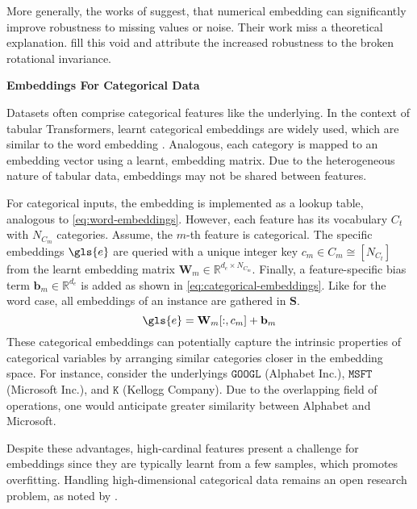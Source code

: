 More generally, the works of \textcites[][1]{gorishniyEmbeddingsNumericalFeatures2022}[][1]{somepalliSaintImprovedNeural2021} suggest, that numerical embedding can significantly improve robustness to missing values or noise. Their work miss a theoretical explanation. \textcite[][8--9]{grinsztajnWhyTreebasedModels2022} fill this void and attribute the increased robustness to the broken rotational invariance.

\textbf{Embeddings For Categorical Data}

Datasets often comprise categorical features like the underlying. In the context of tabular Transformers, learnt categorical embeddings are widely used, which are similar to the word embedding
\autocites[][4]{gorishniyRevisitingDeepLearning2021}[][2]{huangTabTransformerTabularData2020}[][4]{somepalliSaintImprovedNeural2021}. Analogous, each category is mapped to an embedding vector using a learnt, embedding matrix. Due to the heterogeneous nature of tabular data, embeddings may not be shared between features.

For categorical inputs, the embedding is implemented as a lookup table, analogous to \cref{eq:word-embeddings}. However, each feature has
its vocabulary $C_t$ with $N_{C_m}$ categories. Assume, the $m$-th feature is categorical. The specific embeddings $\gls{e}$ are queried with a unique integer key $c_{m} \in C_m \cong\left[N_{C_t}\right]$ from the learnt embedding matrix $\mathbf{W}_m \in \mathbb{R}^{d_e \times N_{C_m}}$. Finally, a feature-specific bias term $\mathbf{b}_m \in \mathbb{R}^{d_{e}}$ is added as shown in \cref{eq:categorical-embeddings}. Like for the word case, all embeddings of an instance are gathered in $\mathbf{S}$.
\begin{equation}
    \gls{e}=\mathbf{W}_m[:,c_{m}] +\mathbf{b}_m
    \label{eq:categorical-embeddings}
\end{equation}
These categorical embeddings can potentially capture the intrinsic properties of categorical variables by arranging similar categories closer in the embedding space. For instance, consider the underlyings $\mathtt{GOOGL}$ (Alphabet Inc.), $\mathtt{MSFT}$ (Microsoft Inc.), and $\mathtt{K}$ (Kellogg Company). Due to the overlapping field of operations, one would anticipate greater similarity between Alphabet and Microsoft.

Despite these advantages, high-cardinal features present a challenge for embeddings since they are typically learnt from a few samples, which promotes \gls{overfitting}. Handling high-dimensional categorical data remains an open research problem, as noted by \textcite[][2]{borisovDeepNeuralNetworks2022}.

